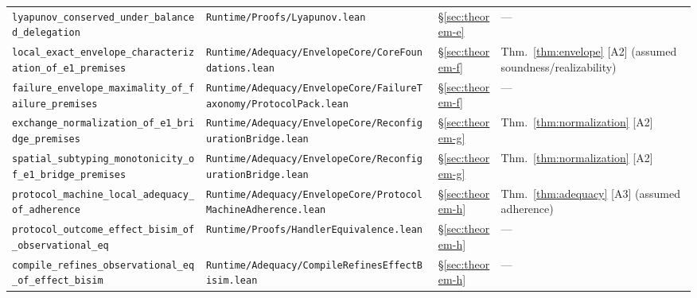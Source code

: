 \documentclass[a4paper,10pt,twocolumn,english]{article}
\numberwithin{equation}{section}
\theoremstyle{paperdef}
\theoremstyle{paperplain}
\theoremstyle{paperdef}
\theoremstyle{paperremark}
\theoremstyle{paperdef}
\begin{document}
\begin{table}[H]
\begin{tabularx}{\textwidth}{L{0.29\textwidth}L{0.37\textwidth}L{0.06\textwidth}>{\raggedright\arraybackslash}X}
		\texttt{lyapunov\_conserved\_\allowbreak under\_balanced\_\allowbreak delegation}            & \texttt{Runtime/\allowbreak Proofs/\allowbreak}\mbox{\texttt{Lyapunov.lean}}                                                      & \S\ref{sec:theorem-e} & ---                                                                                           \\
		\texttt{local\_exact\_envelope\_\allowbreak characterization\_of\_e1\_premises} & \texttt{Runtime/\allowbreak Adequacy/\allowbreak EnvelopeCore/\allowbreak}\mbox{\texttt{CoreFoundations.lean}} & \S\ref{sec:theorem-f} & Thm.~\ref{thm:envelope} [A2] (assumed soundness/realizability) \\
		\texttt{failure\_envelope\_\allowbreak maximality\_of\_failure\_premises} & \texttt{Runtime/\allowbreak Adequacy/\allowbreak EnvelopeCore/\allowbreak}\mbox{\texttt{FailureTaxonomy/ProtocolPack.lean}} & \S\ref{sec:theorem-f} & --- \\
		\texttt{exchange\_normalization\_\allowbreak of\_e1\_bridge\_premises}                       & \texttt{Runtime/\allowbreak Adequacy/\allowbreak EnvelopeCore/\allowbreak}\mbox{\texttt{ReconfigurationBridge.lean}}              & \S\ref{sec:theorem-g} & Thm.~\ref{thm:normalization} [A2]                                                             \\
		\texttt{spatial\_subtyping\_\allowbreak monotonicity\_of\_e1\_\allowbreak bridge\_premises}  & \texttt{Runtime/\allowbreak Adequacy/\allowbreak EnvelopeCore/\allowbreak}\mbox{\texttt{ReconfigurationBridge.lean}}              & \S\ref{sec:theorem-g} & Thm.~\ref{thm:normalization} [A2]                                                             \\
		\texttt{protocol\_machine\_local\_\allowbreak adequacy\_of\_adherence} & \texttt{Runtime/\allowbreak Adequacy/\allowbreak EnvelopeCore/\allowbreak}\mbox{\texttt{ProtocolMachineAdherence.lean}} & \S\ref{sec:theorem-h} & Thm.~\ref{thm:adequacy} [A3] (assumed adherence) \\
		\texttt{protocol\_outcome\_\allowbreak effect\_bisim\_of\_\allowbreak observational\_eq}     & \texttt{Runtime/\allowbreak Proofs/\allowbreak}\mbox{\texttt{HandlerEquivalence.lean}}                                            & \S\ref{sec:theorem-h} & ---                                                                                           \\
		\texttt{compile\_refines\_\allowbreak observational\_eq\_\allowbreak of\_effect\_bisim}      & \texttt{Runtime/\allowbreak Adequacy/\allowbreak}\mbox{\texttt{CompileRefinesEffectBisim.lean}}                                   & \S\ref{sec:theorem-h} & ---                                                                                           \\

\end{tabularx}
\end{table}
\end{document}
